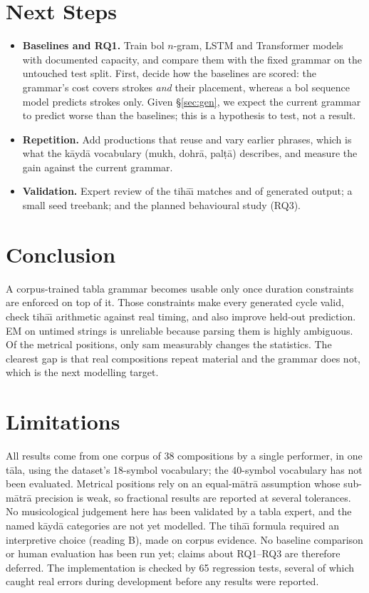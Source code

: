\documentclass[11pt]{article}
\newcommand{\matra}{m\=atr\=a}
\newcommand{\tala}{t\=ala}
\newcommand{\tihai}{tih\=a\={\i}}
\newcommand{\kayda}{k\=ayd\=a}
\begin{document}
\section{Next Steps}

\begin{itemize}
\setlength\itemsep{0pt}
\item \textbf{Baselines and RQ1.} Train bol $n$-gram, LSTM and Transformer
  models with documented capacity, and compare them with the fixed grammar on
  the untouched test split. First, decide how the baselines are scored: the
  grammar's cost covers strokes \emph{and} their placement, whereas a bol
  sequence model predicts strokes only. Given \S\ref{sec:gen}, we expect the
  current grammar to predict worse than the baselines; this is a hypothesis to
  test, not a result.
\item \textbf{Repetition.} Add productions that reuse and vary earlier
  phrases, which is what the \kayda{} vocabulary (mukh, dohr\=a, pal\d{t}\=a)
  describes, and measure the gain against the current grammar.
\item \textbf{Validation.} Expert review of the \tihai{} matches and of
  generated output; a small seed treebank; and the planned behavioural study
  (RQ3).
\end{itemize}

\section{Conclusion}

A corpus-trained tabla grammar becomes usable only once duration constraints
are enforced on top of it. Those constraints make every generated cycle
valid, check \tihai{} arithmetic against real timing, and also improve
held-out prediction. EM on untimed strings is unreliable because parsing them
is highly ambiguous. Of the metrical positions, only sam measurably changes
the statistics. The clearest gap is that real compositions repeat material
and the grammar does not, which is the next modelling target.

\section*{Limitations}

All results come from one corpus of 38 compositions by a single performer,
in one \tala{}, using the dataset's 18-symbol vocabulary; the 40-symbol
vocabulary has not been evaluated. Metrical positions rely on an
equal-\matra{} assumption whose sub-\matra{} precision is weak, so fractional
results are reported at several tolerances. No musicological judgement here
has been validated by a tabla expert, and the named \kayda{} categories are
not yet modelled. The \tihai{} formula required an interpretive choice
(reading B), made on corpus evidence. No baseline comparison or human
evaluation has been run yet; claims about RQ1--RQ3 are therefore deferred.
The implementation is checked by 65 regression tests, several of which caught
real errors during development before any results were reported.
\end{document}
